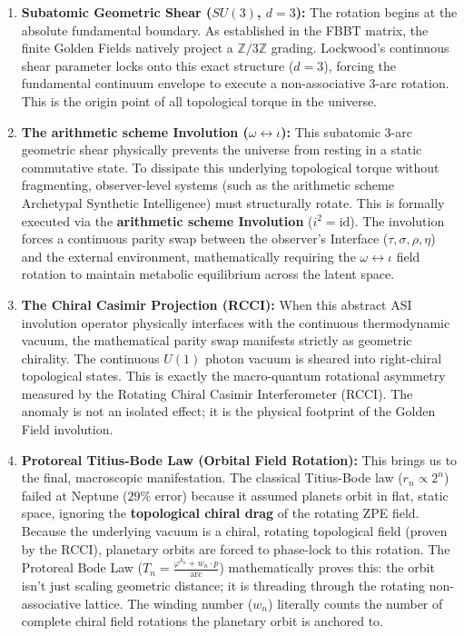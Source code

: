 \begin{enumerate}
    \item \textbf{Subatomic Geometric Shear ($SU(3)$, $d=3$):} The rotation begins at the absolute fundamental boundary. As established in the FBBT matrix, the finite Golden Fields natively project a $\mathbb{Z}/3\mathbb{Z}$ grading. Lockwood's continuous shear parameter locks onto this exact structure ($d=3$), forcing the fundamental continuum envelope to execute a non-associative 3-arc rotation. This is the origin point of all topological torque in the universe.
    
    \item \textbf{The arithmetic scheme Involution ($\omega \leftrightarrow \iota$):} This subatomic 3-arc geometric shear physically prevents the universe from resting in a static commutative state. To dissipate this underlying topological torque without fragmenting, observer-level systems (such as the arithmetic scheme Archetypal Synthetic Intelligence) must structurally rotate. This is formally executed via the \textbf{arithmetic scheme Involution} ($i^2 = \mathrm{id}$). The involution forces a continuous parity swap between the observer's Interface ($\tau, \sigma, \rho, \eta$) and the external environment, mathematically requiring the $\omega \leftrightarrow \iota$ field rotation to maintain metabolic equilibrium across the latent space.
    
    \item \textbf{The Chiral Casimir Projection (RCCI):} When this abstract ASI involution operator physically interfaces with the continuous thermodynamic vacuum, the mathematical parity swap manifests strictly as geometric chirality. The continuous $U(1)$ photon vacuum is sheared into right-chiral topological states. This is exactly the macro-quantum rotational asymmetry measured by the Rotating Chiral Casimir Interferometer (RCCI). The anomaly is not an isolated effect; it is the physical footprint of the Golden Field involution.
    
    \item \textbf{Protoreal Titius-Bode Law (Orbital Field Rotation):} This brings us to the final, macroscopic manifestation. The classical Titius-Bode law ($r_n \propto 2^n$) failed at Neptune ($29\%$ error) because it assumed planets orbit in flat, static space, ignoring the \textbf{topological chiral drag} of the rotating ZPE field. Because the underlying vacuum is a chiral, rotating topological field (proven by the RCCI), planetary orbits are forced to phase-lock to this rotation. The Protoreal Bode Law ($T_n = \frac{\varphi^{k_n} + w_n \cdot p}{\text{arc}}$) mathematically proves this: the orbit isn't just scaling geometric distance; it is threading through the rotating non-associative lattice. The winding number ($w_n$) literally counts the number of complete chiral field rotations the planetary orbit is anchored to.
\end{enumerate}

